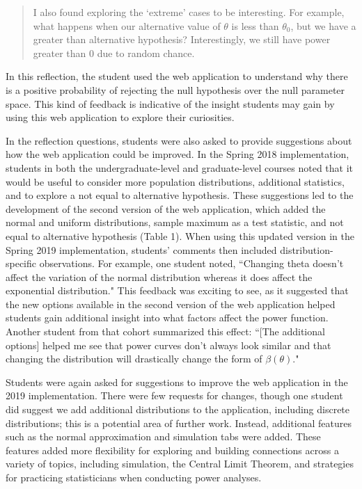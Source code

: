 \documentclass{TISE}
\begin{document}
\begin{quote}
	I also found exploring the `extreme' cases to be interesting. For example, what happens when our alternative value of $\theta$ is less than $\theta_0$, but we have a greater than alternative hypothesis? Interestingly, we still have power greater than 0 due to random chance.
\end{quote}

In this reflection, the student used the web application to understand why there is a positive probability of rejecting the null hypothesis over the null parameter space. This kind of feedback is indicative of the insight students may gain by using this web application to explore their curiosities.

In the reflection questions, students were also asked to provide suggestions about how the web application could be improved. In the Spring 2018 implementation, students in both the undergraduate-level and graduate-level courses noted that it would be useful to consider more population distributions, additional statistics, and to explore a not equal to alternative hypothesis. These suggestions led to the development of the second version of the web application, which added the normal and uniform distributions, sample maximum as a test statistic, and not equal to alternative hypothesis (Table 1). When using this updated version in the Spring 2019 implementation, students' comments then included distribution-specific observations. For example, one student noted, ``Changing theta doesn't affect the variation of the normal distribution whereas it does affect the exponential distribution." This feedback was exciting to see, as it suggested that the new options available in the second version of the web application helped students gain additional insight into what factors affect the power function. Another student from that cohort summarized this effect: ``[The additional options] helped me see that power curves don't always look similar and that changing the distribution will drastically change the form of $\beta(\theta)$." 

Students were again asked for suggestions to improve the web application in the 2019 implementation. There were few requests for changes, though one student did suggest we add additional distributions to the application, including discrete distributions; this is a potential area of further work. Instead, additional features such as the normal approximation and simulation tabs were added. These features added more flexibility for exploring and building connections across a variety of topics, including simulation, the Central Limit Theorem, and strategies for practicing statisticians when conducting power analyses. 
\end{document}
